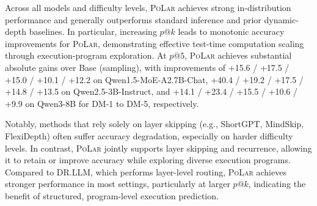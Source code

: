 \documentclass{article}
\theoremstyle{plain}
\theoremstyle{definition}
\theoremstyle{remark}
\newcommand\ours{\textsc{PoLar}\xspace}
\begin{document}
Across all models and difficulty levels, \ours achieves strong in-distribution performance and generally outperforms standard inference and prior dynamic-depth baselines.
In particular, increasing $p@k$ leads to monotonic accuracy improvements for \ours, demonstrating effective test-time computation scaling through execution-program exploration.
At $p@5$, \ours achieves substantial absolute gains over Base (sampling), with improvements of
+15.6 / +17.5 / +15.0 / +10.1 / +12.2 on Qwen1.5-MoE-A2.7B-Chat,
+40.4 / +19.2 / +17.5 / +14.8 / +13.5 on Qwen2.5-3B-Instruct,
and +14.1 / +23.4 / +15.5 / +10.6 / +9.9 on Qwen3-8B for DM-1 to DM-5, respectively.

Notably, methods that rely solely on layer skipping (e.g., ShortGPT, MindSkip, FlexiDepth) often suffer accuracy degradation, especially on harder difficulty levels.
In contrast, \ours jointly supports layer skipping and recurrence, allowing it to retain or improve accuracy while exploring diverse execution programs.
Compared to DR.LLM, which performs layer-level routing, \ours achieves stronger performance in most settings, particularly at larger $p@k$, indicating the benefit of structured, program-level execution prediction.
\end{document}
